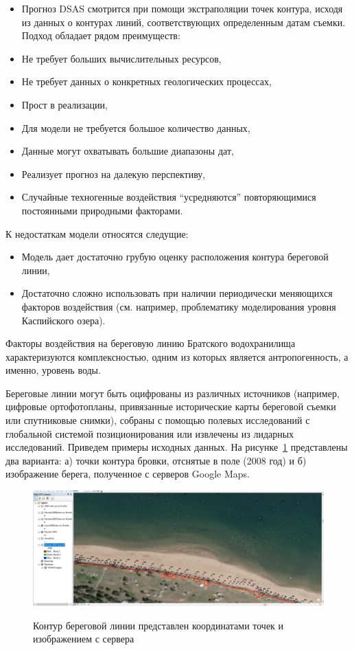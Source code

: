 \documentclass[732,14pt,final]{studrep}
\begin{document}
\begin{itemize}
\item Прогноз DSAS смотрится при помощи экстраполяции точек контура, исходя из данных о контурах линий, соответствующих определенным датам съемки. Подход обладает рядом преимуществ:
\item   Не требует больших вычислительных ресурсов,
\item   Не требует данных о конкретных геологических процессах,
\item   Прост в реализации,
\item   Для модели не требуется большое количество данных,
\item   Данные могут охватывать большие диапазоны дат,
\item   Реализует прогноз на далекую перспективу,
\item   Случайные техногенные воздействия “усредняются” повторяющимися постоянными природными факторами.
\end{itemize}

К недостаткам модели относятся следущие:

\begin{itemize}
\item Модель дает достаточно грубую оценку расположения контура береговой линии,
\item Достаточно сложно использовать при наличии периодически меняющихся факторов воздействия (см. например, проблематику моделирования уровня Каспийского озера).
\end{itemize}
Факторы воздействия на береговую линию Братского водохранилища характеризуются комплексностью, одним из которых является антропогенность, а именно, уровень воды. 

Береговые линии могут быть оцифрованы из различных источников (например, цифровые ортофотопланы, привязанные исторические карты береговой съемки или спутниковые снимки), собраны с помощью полевых исследований с глобальной системой позиционирования или извлечены из лидарных исследований. Приведем примеры исходных данных. На рисунке~\ref{fig:google-src} представлены два варианта: а) точки контура бровки, отснятые в поле (2008 год) и б) изображение берега, полученное с серверов Google Maps.

\begin{figure}[htp]
  \centering
  \includegraphics[width=\linewidth]{pics/image22.png}\label{fig:google-src}
  \caption{Контур береговой линии представлен координатами точек и изображением с сервера}
\end{figure}
\end{document}
